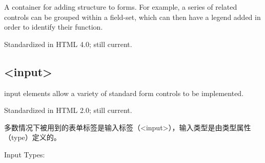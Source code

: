 A container for adding structure to forms. For example, a series of related controls can be grouped within a field-set, which can then have a legend added in order to identify their function.

Standardized in HTML 4.0; still current.


\subsection{<input>}

input elements allow a variety of standard form controls to be implemented.

Standardized in HTML 2.0; still current.

多数情况下被用到的表单标签是输入标签（<input>），输入类型是由类型属性（type）定义的。

Input Types:

